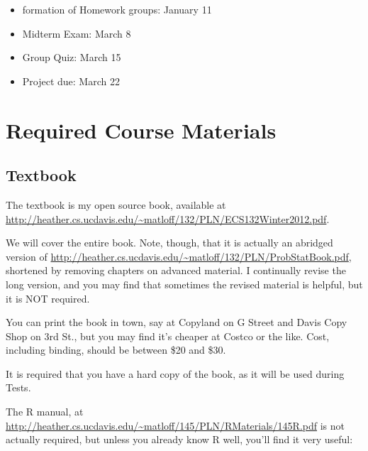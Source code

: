  




\begin{itemize}

\item formation of Homework groups: January 11

\item Midterm Exam:  March 8

\item Group Quiz:  March 15

\item Project due:  March 22

\end{itemize}

\section{Required Course Materials}

\subsection{Textbook}
\label{text}

The textbook is my open source book, available at
\url{http://heather.cs.ucdavis.edu/~matloff/132/PLN/ECS132Winter2012.pdf}.

We will cover the entire book.  Note, though, that it is actually an
abridged version of
\url{http://heather.cs.ucdavis.edu/~matloff/132/PLN/ProbStatBook.pdf},
shortened by removing chapters on advanced material.  I continually
revise the long version, and you may find that sometimes the revised
material is helpful, but it is NOT required.

You can print the book in town, say at Copyland on G Street and Davis
Copy Shop on 3rd St., but you may find it's cheaper at Costco or the
like.  Cost, including binding, should be between \$20 and \$30.

It is required that you have a hard copy of the book, as it will be used
during Tests.

The R manual, at
\url{http://heather.cs.ucdavis.edu/~matloff/145/PLN/RMaterials/145R.pdf}
is not actually required, but unless you already know R well, you'll
find it very useful:


